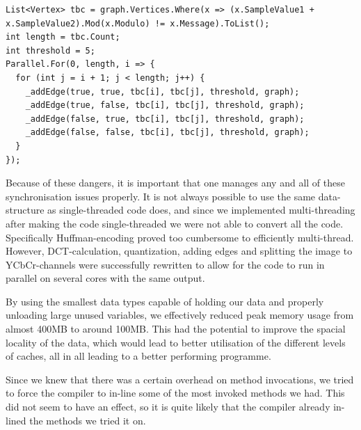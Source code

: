\begin{lstlisting}[firstnumber=677,label=lst:parallelEdgeAdding, caption={Parallelisation of the algorithm for adding edges to the graph.
\textbf{File:} third\textunderscore  round/CS/JPEGImage.cs.}]
List<Vertex> tbc = graph.Vertices.Where(x => (x.SampleValue1 + x.SampleValue2).Mod(x.Modulo) != x.Message).ToList();
int length = tbc.Count;
int threshold = 5;
Parallel.For(0, length, i => {
  for (int j = i + 1; j < length; j++) {
    _addEdge(true, true, tbc[i], tbc[j], threshold, graph);
    _addEdge(true, false, tbc[i], tbc[j], threshold, graph);
    _addEdge(false, true, tbc[i], tbc[j], threshold, graph);
    _addEdge(false, false, tbc[i], tbc[j], threshold, graph);
  }
});
\end{lstlisting}

\FloatBarrier

Because of these dangers, it is important that one manages any and all of these synchronisation issues properly.
It is not always possible to use the same data-structure as single-threaded code does, and since we implemented multi-threading after making the code single-threaded we were not able to convert all the code.
Specifically Huffman-encoding proved too cumbersome to efficiently multi-thread.
However, DCT-calculation, quantization, adding edges and splitting the image to YCbCr-channels were successfully rewritten to allow for the code to run in parallel on several cores with the same output.

By using the smallest data types capable of holding our data and properly unloading large unused variables, we effectively reduced peak memory usage from almost 400MB to around 100MB.
This had the potential to improve the spacial locality of the data, which would lead to better utilisation of the different levels of caches, all in all leading to a better performing programme.

Since we knew that there was a certain overhead on method invocations, we tried to force the compiler to in-line some of the most invoked methods we had. 
This did not seem to have an effect, so it is quite likely that the compiler already in-lined the methods we tried it on.

